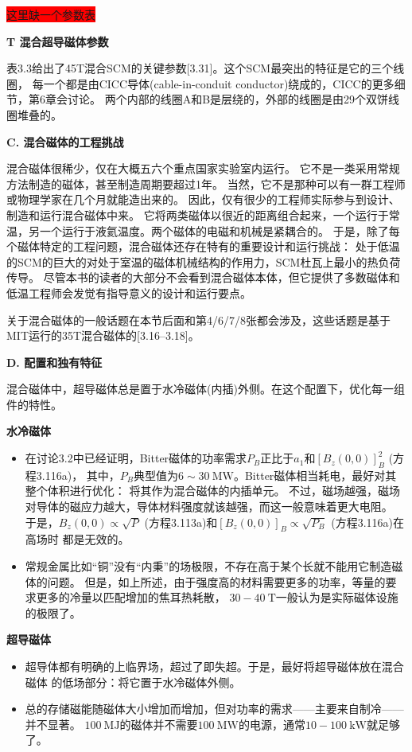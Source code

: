 \colorbox{red}{这里缺一个参数表}

\textbf{ T 混合超导磁体参数}

表3.3给出了45T混合SCM的关键参数[3.31]。这个SCM最突出的特征是它的三个线圈，
每一个都是由CICC导体(cable-in-conduit conductor)绕成的，CICC的更多细节，第6章会讨论。
两个内部的线圈A和B是层绕的，外部的线圈是由29个双饼线圈堆叠的。

\textbf{C. 混合磁体的工程挑战}

混合磁体很稀少，仅在大概五六个重点国家实验室内运行。
它不是一类采用常规方法制造的磁体，甚至制造周期要超过1年。
当然，它不是那种可以有一群工程师或物理学家在几个月就能造出来的。
因此，仅有很少的工程师实际参与到设计、制造和运行混合磁体中来。
它将两类磁体以很近的距离组合起来，一个运行于常温，另一个运行于液氦温度。两个磁体的电磁和机械是紧耦合的。
于是，除了每个磁体特定的工程问题，混合磁体还存在特有的重要设计和运行挑战：
处于低温的SCM的巨大的对处于室温的磁体机械结构的作用力，SCM杜瓦上最小的热负荷传导。
尽管本书的读者的大部分不会看到混合磁体本体，但它提供了多数磁体和低温工程师会发觉有指导意义的设计和运行要点。

关于混合磁体的一般话题在本节后面和第4/6/7/8张都会涉及，这些话题是基于MIT运行的35T混合磁体的[3.16–3.18]。

\textbf{D. 配置和独有特征}

混合磁体中，超导磁体总是置于水冷磁体(内插)外侧。在这个配置下，优化每一组件的特性。

\textbf{\kaishu 水冷磁体}
\begin{itemize}
	\item 在讨论3.2中已经证明，Bitter磁体的功率需求$P_B$正比于$a_1$和$[B_z(0, 0)]^2_B$ (方程3.116a)，
	其中，$P_B$典型值为$6\sim 30\ \mathrm{MW}$。Bitter磁体相当耗电，最好对其整个体积进行优化：
	将其作为混合磁体的内插单元。
	不过，磁场越强，磁场对导体的磁应力越大，导体材料强度就该越强，而这一般意味着更大电阻。
	于是，$B_z(0, 0)\propto\sqrt{P}$ (方程3.113a)和$[B_z(0, 0)]_B\propto\sqrt{P_B}$ (方程3.116a)在高场时
	都是无效的。
	
	\item 常规金属比如“铜”没有“内秉”的场极限，不存在高于某个长就不能用它制造磁体的问题。
	但是，如上所述，由于强度高的材料需要更多的功率，等量的要求更多的冷量以匹配增加的焦耳热耗散，
	$30-40\ \mathrm{T}$一般认为是实际磁体设施的极限了。
\end{itemize}

\textbf{\kaishu 超导磁体}
\begin{itemize}
	\item 超导体都有明确的上临界场，超过了即失超。于是，最好将超导磁体放在混合磁体
	的低场部分：将它置于水冷磁体外侧。
	
	\item 总的存储磁能随磁体大小增加而增加，但对功率的需求——主要来自制冷——并不显著。
	$100\ \mathrm{MJ}$的磁体并不需要$100\ \mathrm{MW}$的电源，通常$10-100\ \mathrm{kW}$就足够了。
\end{itemize}

